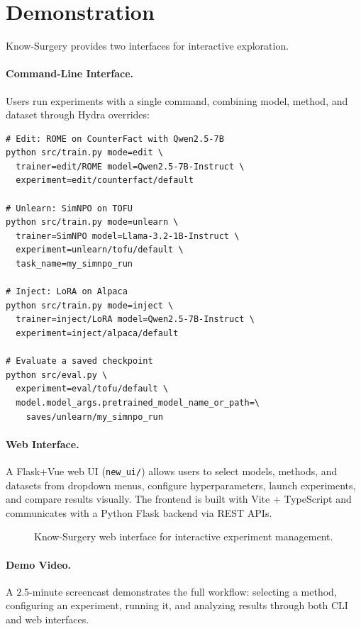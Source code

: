 \section{Demonstration}
\label{sec:demo}

Know-Surgery provides two interfaces for interactive exploration.

\paragraph{Command-Line Interface.}
Users run experiments with a single command, combining model, method, and dataset through Hydra overrides:

\begin{lstlisting}
# Edit: ROME on CounterFact with Qwen2.5-7B
python src/train.py mode=edit \
  trainer=edit/ROME model=Qwen2.5-7B-Instruct \
  experiment=edit/counterfact/default

# Unlearn: SimNPO on TOFU
python src/train.py mode=unlearn \
  trainer=SimNPO model=Llama-3.2-1B-Instruct \
  experiment=unlearn/tofu/default \
  task_name=my_simnpo_run

# Inject: LoRA on Alpaca
python src/train.py mode=inject \
  trainer=inject/LoRA model=Qwen2.5-7B-Instruct \
  experiment=inject/alpaca/default

# Evaluate a saved checkpoint
python src/eval.py \
  experiment=eval/tofu/default \
  model.model_args.pretrained_model_name_or_path=\
    saves/unlearn/my_simnpo_run
\end{lstlisting}

\paragraph{Web Interface.}
A Flask+Vue web UI (\texttt{new\_ui/}) allows users to select models, methods, and datasets from dropdown menus, configure hyperparameters, launch experiments, and compare results visually. The frontend is built with Vite + TypeScript and communicates with a Python Flask backend via REST APIs.

\begin{figure}[t]
\centering
{}
\caption{Know-Surgery web interface for interactive experiment management.}
\label{fig:webui}
\end{figure}

\paragraph{Demo Video.}
A 2.5-minute screencast demonstrates the full workflow: selecting a method, configuring an experiment, running it, and analyzing results through both CLI and web interfaces.
